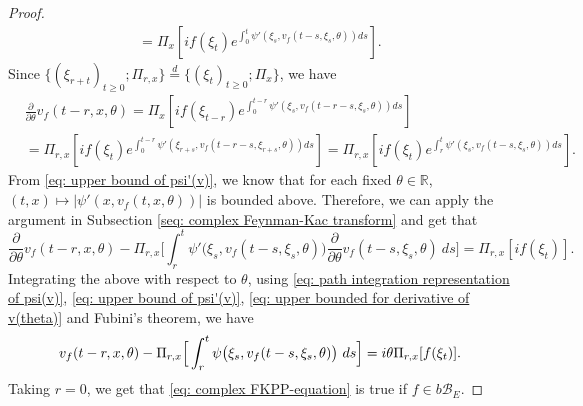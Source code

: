 \documentclass[12pt, a4paper]{amsart}
\theoremstyle{definition}
\numberwithin{equation}{section}
\begin{document}
\begin{proof}
\begin{align}
	= \Pi_x[ if(\xi_t) e^{\int_0^t \psi'(\xi_s, v_f(t-s,\xi_s,\theta)) ds} ].
\end{align}
	Since $\{(\xi_{r+t})_{t \geq 0}; \Pi_{r,x}\} \overset{d}{=} \{(\xi_{t})_{t\geq 0}; \Pi_{x}\} $, we have
\begin{align}
	&\frac{\partial}{\partial \theta} v_f(t - r, x, \theta)
	= \Pi_x[ if(\xi_{t-r}) e^{\int_0^{t-r} \psi'(\xi_s, v_f(t-r-s,\xi_s,\theta)) ds} ]
	\\&= \Pi_{r,x}[if(\xi_t)e^{\int_0^{t-r} \psi'(\xi_{r+s}, v_f(t-r-s,\xi_{r+s},\theta)) ds} ]
	= \Pi_{r,x}[if(\xi_t)e^{\int_r^t \psi'(\xi_{s}, v_f(t-s,\xi_{s},\theta)) ds} ].
\end{align}
    From \eqref{eq: upper bound of psi'(v)}, we know that for each fixed $\theta \in \mathbb R$, $(t,x) \mapsto |\psi'(x,v_f(t,x,\theta))|$ is bounded above.
	Therefore, we can apply the argument in Subsection \ref{seq: complex Feynman-Kac transform} and get that
\begin{equation}
	\frac{\partial}{\partial \theta} v_f(t-r, x, \theta) - \Pi_{r,x} \Big[\int_r^t \psi'\big(\xi_s, v_f(t-s,\xi_s,\theta)\big)\frac{\partial}{\partial \theta} v_f(t-s, \xi_s, \theta)~ds\Big]
	= \Pi_{r,x} [i f(\xi_t)].
\end{equation}
	Integrating the above with respect to $\theta$, using \eqref{eq: path integration representation of psi(v)}, \eqref{eq: upper bound of psi'(v)}, \eqref{eq: upper bounded for derivative of v(theta)} and Fubini's theorem, we have
\begin{equation}
	v_f(t-r,x,\theta) - \Pi_{r,x} \Big[\int_r^t \psi\big(\xi_s,v_f(t-s,\xi_s,\theta)\big) ~ds\Big]
	\\= i\theta \Pi_{r,x} [f(\xi_t)].
\end{equation}
    Taking $r = 0$, we get that \eqref{eq: complex FKPP-equation} is true if $f\in b\mathscr B_E$.


\end{proof}
\end{document}
